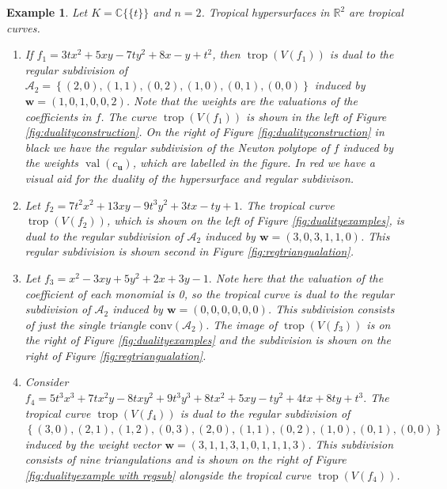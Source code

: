 \documentclass[11pt,reqno,a4paper]{article}
\theoremstyle{theoremstyle}
\theoremstyle{examplestyle}
\newtheorem{example}[theorem]{Example}
\theoremstyle{algorithmstyle}
\numberwithin{equation}{subsection}
\newcommand{\RR}{\mathbb{R}}
\newcommand{\puiseux}{\mathbb{C}\{\{t\}\}}
\DeclareMathOperator{\trop}{trop}
\DeclareMathOperator{\val}{val}
\begin{document}
\begin{example} \label{ex:duality}
    Let $K = \puiseux$ and $n = 2$. Tropical hypersurfaces in $\RR^2$ are tropical curves.
    \begin{enumerate}
        \item If $f_1 = 3tx^2 + 5xy-7ty^2 +8x -y +t^2$, then $\trop(V(f_1))$ is dual to the regular subdivision of $\mathcal{A}_2 = \left\{ (2,0), (1,1), (0,2), (1,0), (0,1), (0,0)  \right\} $ induced by $\mathbf{w} = (1,0,1,0,0,2)$. Note that the weights are the valuations of the coefficients in $f$. The curve $\trop(V(f_1))$ is shown in the left of Figure \ref{fig:dualityconstruction}. On the right of Figure \ref{fig:dualityconstruction} in black we have the regular subdivision of the Newton polytope of $f$ induced by the weights $\val(c_\textbf{u})$, which are labelled in the figure. In red we have a visual aid for the duality of the hypersurface and regular subdivison. 

        \item Let $f_2 = 7t^2x^2 +13xy - 9t^3y^2 + 3tx - ty + 1.$ The tropical curve $\trop(V(f_2))$, which is shown on the left of Figure \ref{fig:dualityexamples}, is dual to the regular subdivision of $\mathcal{A}_2$ induced by $\textbf{w} = (3,0,3,1,1,0)$. This regular subdivision is shown second in Figure \ref{fig:regtriangualation}.

        \item Let $f_3 = x^2 - 3xy + 5y^2 + 2x + 3y - 1.$ Note here that the valuation of the coefficient of each monomial is 0, so the tropical curve is dual to the regular subdivision of $\mathcal{A}_2$ induced by $\textbf{w} = (0,0,0,0,0,0)$. This subdivision consists of just the single triangle $\text{conv}(\mathcal{A}_2)$. The image of $\trop(V(f_3))$ is on the right of Figure \ref{fig:dualityexamples} and the subdivision is shown on the right of Figure \ref{fig:regtriangualation}.
        
        \item Consider $f_4 = 5t^3x^3 +7tx^2y -8txy^2 +9t^3y^3 + 8tx^2 + 5xy -ty^2 +4tx + 8ty + t^3.$ The tropical curve $\trop(V(f_4))$ is dual to the regular subdivision of $\left\{(3,0), (2,1), (1,2), (0,3), (2,0), (1,1), (0,2), (1,0), (0,1), (0,0) \right\}$ induced by the weight vector $\textbf{w} = (3,1,1,3,1,0,1,1,1,3)$. This subdivision consists of nine triangulations and is shown on the right of Figure \ref{fig:dualityexample with regsub} alongside the tropical curve $\trop(V(f_4))$.
    \end{enumerate}
\end{example}
\end{document}
